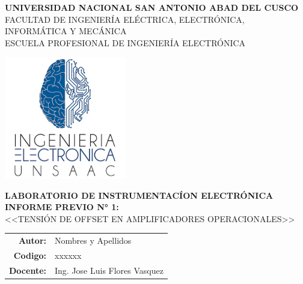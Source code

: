 \begin{titlepage}

  \begin{center}
    \Large{\textbf{UNIVERSIDAD NACIONAL SAN ANTONIO ABAD DEL CUSCO}} \\ 
    \vspace{0.4cm}
    \large{FACULTAD DE INGENIER\'IA EL\'ECTRICA, ELECTR\'ONICA, INFORM\'ATICA Y MEC\'ANICA}\ \\ 
    \vspace{0.1cm} 
    \large{ESCUELA PROFESIONAL DE INGENIER\'IA ELECTR\'ONICA}\ \\ 
	
    \vspace{1.0cm}    
    
    \includegraphics[width=0.4\textwidth]{images/LI-UNSAAC.png} \\


    \vspace{0.8cm}

    \large{\textbf{\textsc{LABORATORIO DE INSTRUMENTAC\'ION ELECTR\'ONICA}}} \\
    \vspace{0.2cm}
    \large{\textbf{\textsc{INFORME PREVIO N° 1:}}} \\ 
    
    
    \vspace{0.5cm}
    \large{ \textsc{<<TENSI\'ON DE OFFSET EN AMPLIFICADORES OPERACIONALES>>}} \\
    \vspace{1.0cm}
    
    \begin{table}[H]
	\centering
	\begin{tabular}{rl}
	\large{\textbf{Autor:}}   & \large{Nombres y Apellidos }  \\
        \large{\textbf{Codigo:}}   & \large{xxxxxx}  \\
        \large{\textbf{Docente:}} & \large{Ing. Jose Luis Flores Vasquez}
	\end{tabular}
	\end{table}


\end{center}
\end{titlepage}
